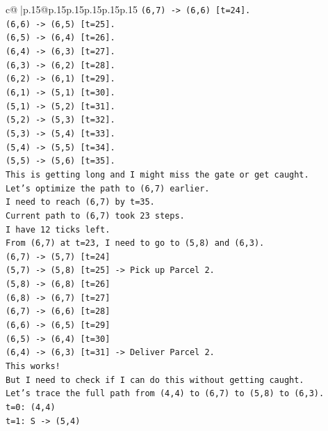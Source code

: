 \documentclass{article}
\begin{document}
{\begin{supertabular}{c@{$\;$}|p{.15\linewidth}@{}p{.15\linewidth}p{.15\linewidth}p{.15\linewidth}p{.15\linewidth}p{.15\linewidth}}
{{{\texttt{(6,7) {-}> (6,6) {[}t=24{]}.} \\
\texttt{(6,6) {-}> (6,5) {[}t=25{]}.} \\
\texttt{(6,5) {-}> (6,4) {[}t=26{]}.} \\
\texttt{(6,4) {-}> (6,3) {[}t=27{]}.} \\
\texttt{(6,3) {-}> (6,2) {[}t=28{]}.} \\
\texttt{(6,2) {-}> (6,1) {[}t=29{]}.} \\
\texttt{(6,1) {-}> (5,1) {[}t=30{]}.} \\
\texttt{(5,1) {-}> (5,2) {[}t=31{]}.} \\
\texttt{(5,2) {-}> (5,3) {[}t=32{]}.} \\
\texttt{(5,3) {-}> (5,4) {[}t=33{]}.} \\
\texttt{(5,4) {-}> (5,5) {[}t=34{]}.} \\
\texttt{(5,5) {-}> (5,6) {[}t=35{]}.} \\
\texttt{This is getting long and I might miss the gate or get caught.} \\
\texttt{Let's optimize the path to (6,7) earlier.} \\
\texttt{I need to reach (6,7) by t=35.} \\
\texttt{Current path to (6,7) took 23 steps.} \\
\texttt{I have 12 ticks left.} \\
\texttt{From (6,7) at t=23, I need to go to (5,8) and (6,3).} \\
\texttt{(6,7) {-}> (5,7) {[}t=24{]}} \\
\texttt{(5,7) {-}> (5,8) {[}t=25{]} {-}> Pick up Parcel 2.} \\
\texttt{(5,8) {-}> (6,8) {[}t=26{]}} \\
\texttt{(6,8) {-}> (6,7) {[}t=27{]}} \\
\texttt{(6,7) {-}> (6,6) {[}t=28{]}} \\
\texttt{(6,6) {-}> (6,5) {[}t=29{]}} \\
\texttt{(6,5) {-}> (6,4) {[}t=30{]}} \\
\texttt{(6,4) {-}> (6,3) {[}t=31{]} {-}> Deliver Parcel 2.} \\
\texttt{This works!} \\
\texttt{But I need to check if I can do this without getting caught.} \\
\texttt{Let's trace the full path from (4,4) to (6,7) to (5,8) to (6,3).} \\
\texttt{t=0: (4,4)} \\
\texttt{t=1: S {-}> (5,4)} \\
}}}
\end{supertabular}}
\end{document}
